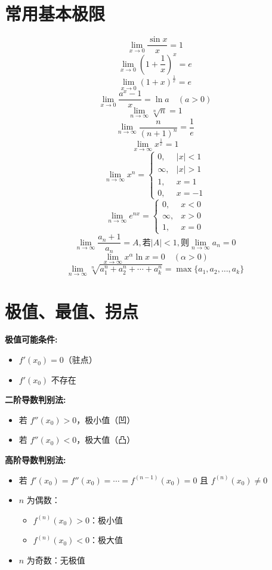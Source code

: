 \documentclass[10pt]{article}
\begin{document}
\newpage
\begin{multicols*}{2}
\raggedcolumns


\section*{常用基本极限}
\vspace{-8pt}

\[\lim_{x \to 0} \frac{\sin x}{x} = 1\]
\[\lim_{x \to 0} (1 + \frac{1}{x})^x = e\]
\[\lim_{x \to 0} (1 + x)^{\frac{1}{x}} = e\]
\[\lim_{x \to 0} \frac{a^x - 1}{x} = \ln a \quad (a > 0)\]
\[\lim_{n \to \infty} \sqrt[n]{n} = 1\]
\[\lim_{n \to \infty} \frac{n}{(n + 1)^n} = \frac{1}{e}\]
\[\lim_{x \to \infty} x^{\frac{1}{x}} = 1\]
\[\lim_{n \to \infty} x^n = \begin{cases} 0, & |x| < 1 \\ \infty, & |x| > 1 \\ 1, & x = 1 \\ 0, & x = -1 \end{cases}\]
\[\lim_{n \to \infty} e^{nx} = \begin{cases} 0, & x < 0 \\ \infty, & x > 0 \\ 1, & x = 0 \end{cases}\]
\[\lim_{n \to \infty} \frac{a_n + 1}{a_n} = A, \text{若} |A| < 1, \text{则} \lim_{n \to \infty} a_n = 0\]
\[\lim_{x \to \infty} x^\alpha \ln x = 0 \quad (\alpha > 0)\]
\[\lim_{n \to \infty} \sqrt[n]{a_1^n + a_2^n + \cdots + a_k^n} = \max\{a_1, a_2, \ldots, a_k\}\]



\section*{极值、最值、拐点}
\vspace{-8pt}
\textbf{极值可能条件:}
\begin{itemize}
  \item \(f'(x_0) = 0\)（驻点）
  \item \(f'(x_0)\) 不存在
\end{itemize}

\textbf{二阶导数判别法:}
\begin{itemize}
  \item 若 \(f''(x_0) > 0\)，极小值（凹）
  \item 若 \(f''(x_0) < 0\)，极大值（凸）
\end{itemize}

\textbf{高阶导数判别法:}
\begin{itemize}
  \item 若 \(f'(x_0) = f''(x_0) = \cdots = f^{(n-1)}(x_0) = 0\) 且 \(f^{(n)}(x_0) \neq 0\)
  \item \(n\) 为偶数：
    \begin{itemize}
      \item \(f^{(n)}(x_0) > 0\)：极小值
      \item \(f^{(n)}(x_0) < 0\)：极大值
    \end{itemize}
  \item \(n\) 为奇数：无极值
\end{itemize}


\end{multicols*}
\end{document}
